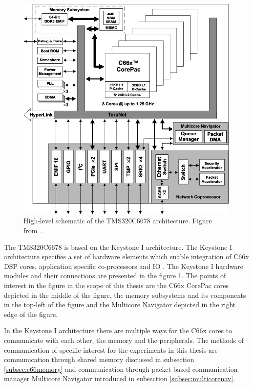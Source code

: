 \begin{figure}[h!]
    \begin{center}
        \includegraphics[width=0.99\textwidth]{images/fbd_SPRS691e.png}
        \caption{High-level schematic of the TMS320C6678 architecture. Figure from~\cite{tmsdatasheet}.}
        \label{fig:arch_overview}
    \end{center}
\end{figure}

The TMS320C6678 is based on the Keystone I architecture. The Keystone I architecture specifies a set of hardware elements which enable integration of C66x DSP cores, application specific co-processors and IO \cite{tmsdatasheet}. The Keystone I hardware modules and their connections are presented in the figure \ref{fig:arch_overview}. The points of interest in the figure in the scope of this thesis are the C66x CorePac cores depicted in the middle of the figure, the memory subsystems and its components in the top-left of the figure and the Multicore Navigator depicted in the right edge of the figure.

In the Keystone I architecture there are multiple ways for the C66x cores to communicate with each other, the memory and the peripherals. The methods of communication of specific interest for the experiments in this thesis are communication through shared memory discussed in subsection \ref{subsec:c66memory} and communication through packet based communication manager Multicore Navigator introduced in subsection \ref{subsec:multicorenav}.

